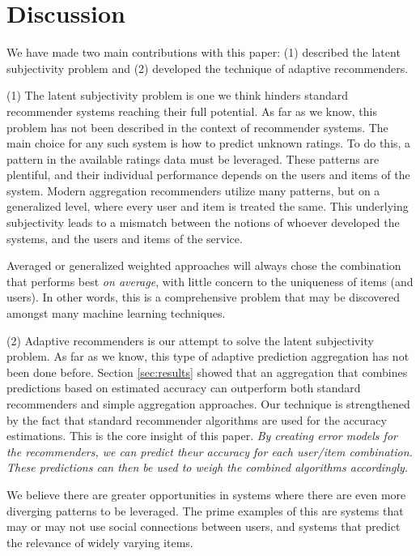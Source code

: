 \section{Discussion}
\label{sec:discussion}

We have made two main contributions with this paper:
(1) described the latent subjectivity problem and
(2) developed the technique of adaptive recommenders.

(1) The latent subjectivity problem is one we think hinders
standard recommender systems reaching their full potential.
As far as we know, this problem has not been described
in the context of recommender systems.
The main choice for any such system is how to predict unknown ratings.
To do this, a pattern in the available ratings data must be leveraged.
These patterns are plentiful, and their individual performance
depends on the users and items of the system.
Modern aggregation recommenders utilize many patterns, but on a generalized
level, where every user and item is treated the same.
This underlying subjectivity leads to a mismatch between the notions
of whoever developed the systems, and the users and items of the service.

Averaged or generalized weighted approaches will always
chose the combination that performs best \emph{on average},
with little concern to the uniqueness of items (and users).
In other words, this is a comprehensive problem
that may be discovered amongst many machine learning techniques.

(2) Adaptive recommenders is our attempt to solve the latent subjectivity problem.
As far as we know, this type of adaptive prediction aggregation has not been done before.
Section \ref{sec:results} showed that an aggregation that combines predictions based
on estimated accuracy can outperform both standard recommenders and simple aggregation approaches.
Our technique is strengthened by the fact that standard recommender algorithms
are used for the accuracy estimations.
This is the core insight of this paper.
\emph{By creating error models for the recommenders, we can predict
theur accuracy for each user/item combination.
These predictions can then be used to weigh the combined algorithms accordingly.}

We believe there are greater opportunities in systems where there  are even more diverging
patterns to be leveraged. The prime examples of this are systems that may or may 
not use social connections between users, and systems that predict the 
relevance of widely varying items.

